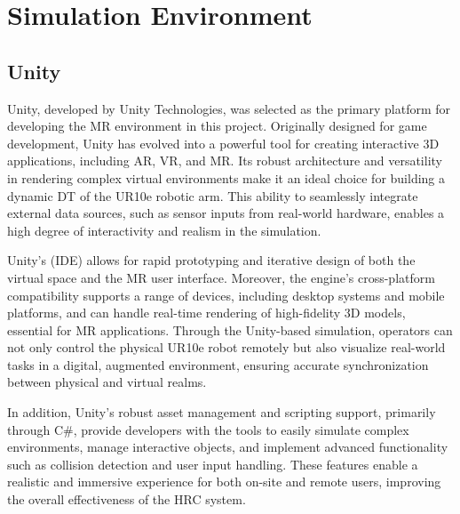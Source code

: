\section{Simulation Environment}

\subsection{Unity}

Unity, developed by Unity Technologies, was selected as the primary platform for developing the \ac{MR} environment in this project. Originally designed for game development, Unity has evolved into a powerful tool for creating interactive 3D applications, including \ac{AR}, \ac{VR}, and \ac{MR}. Its robust architecture and versatility in rendering complex virtual environments make it an ideal choice for building a dynamic \ac{DT} of the UR10e robotic arm. This ability to seamlessly integrate external data sources, such as sensor inputs from real-world hardware, enables a high degree of interactivity and realism in the simulation.

Unity’s (\ac{IDE}) allows for rapid prototyping and iterative design of both the virtual space and the \ac{MR} user interface. Moreover, the engine's cross-platform compatibility supports a range of devices, including desktop systems and mobile platforms, and can handle real-time rendering of high-fidelity 3D models, essential for \ac{MR} applications. 
Through the Unity-based simulation, operators can not only control the physical UR10e robot remotely but also visualize real-world tasks in a digital, augmented environment, ensuring accurate synchronization between physical and virtual realms.

In addition, Unity’s robust asset management and scripting support, primarily through C\#, provide developers with the tools to easily simulate complex environments, manage interactive objects, and implement advanced functionality such as collision detection and user input handling. These features enable a realistic and immersive experience for both on-site and remote users, improving the overall effectiveness of the \ac{HRC} system.




